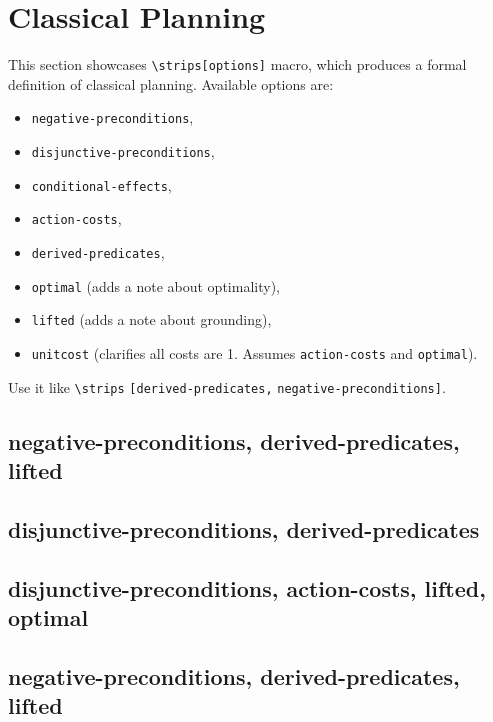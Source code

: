 \section{Classical Planning}
This section showcases \verb`\strips[options]` macro, which produces a formal definition of classical planning.
Available options are:
\begin{itemize}
 \item \texttt{negative-preconditions},
 \item \texttt{disjunctive-preconditions},
 \item \texttt{conditional-effects},
 \item \texttt{action-costs},
 \item \texttt{derived-predicates},
 \item \texttt{optimal} (adds a note about optimality),
 \item \texttt{lifted} (adds a note about grounding),
 \item \texttt{unitcost} (clarifies all costs are 1. Assumes \texttt{action-costs} and \texttt{optimal}).
\end{itemize}
Use it like \verb`\strips` \texttt{[derived-predicates,} \texttt{negative-preconditions]}.

\subsection{negative-preconditions, derived-predicates, lifted}
\subsection{disjunctive-preconditions, derived-predicates}
\subsection{disjunctive-preconditions, action-costs, lifted, optimal}
\subsection{}
\strips[]
\subsection{negative-preconditions, derived-predicates, lifted}
